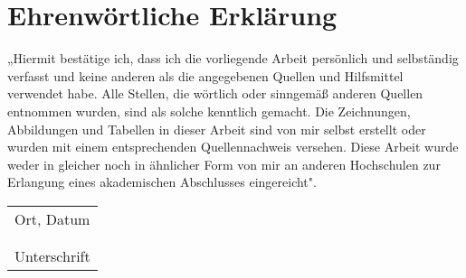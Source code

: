 \section{Ehrenwörtliche Erklärung}
„Hiermit bestätige ich, dass ich die vorliegende Arbeit persönlich und selbständig verfasst und keine anderen als die angegebenen Quellen und Hilfsmittel verwendet habe. Alle Stellen, die wörtlich oder sinngemäß anderen Quellen entnommen wurden, sind als solche kenntlich gemacht. Die Zeichnungen, Abbildungen und Tabellen in dieser Arbeit sind von mir selbst erstellt oder wurden mit einem entsprechenden Quellennachweis versehen. Diese Arbeit wurde weder in gleicher noch in ähnlicher Form von mir an anderen Hochschulen zur Erlangung eines akademischen Abschlusses eingereicht".

\vspace{2cm}
\begin{tabular}{l}
Ort, Datum\\
\\
\\
Unterschrift
\end{tabular}
